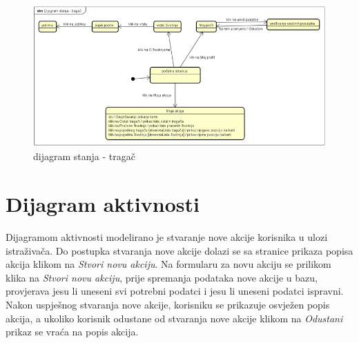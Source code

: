		\begin{figure}[H]
			\includegraphics[scale=0.5]{slike/dijagram stanja - tragač.png}
			\centering
			\caption{dijagram stanja - tragač}
			\label{fig:dijagram stanja - tragač}
		\end{figure}
			
			\eject 
		
		\section{Dijagram aktivnosti}

		Dijagramom aktivnosti modelirano je stvaranje nove akcije korisnika u ulozi istraživača.
		Do postupka stvaranja nove akcije dolazi se sa stranice prikaza popisa akcija klikom na 
		\textit{Stvori novu akciju}. Na formularu za novu akciju se prilikom klika na \textit{Stvori novu akciju},
		prije spremanja podataka nove akcije u bazu, provjerava jesu li uneseni svi potrebni podatci i jesu li uneseni podatci ispravni.
		Nakon uspješnog stvaranja nove akcije, korisniku se prikazuje osvježen popis akcija, a ukoliko korisnik odustane od stvaranja nove akcije klikom na 
		\textit{Odustani} prikaz se vraća na popis akcija.

